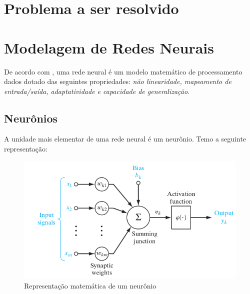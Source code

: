 \section{Problema a ser resolvido}

\section{Modelagem de Redes Neurais}
De acordo com \cite{haykin}, uma rede neural é um modelo matemático de processamento dados  dotado das seguintes propriedades: \textit{não linearidade, mapeamento de entrada/saída, adaptatividade e capacidade de generalização}. 



\subsection{Neurônios}
A unidade mais elementar de uma rede neural é um neurônio. Temo a seguinte representação: 
\begin{figure}[h!]
	\centering
	\includegraphics[width=0.5\linewidth]{imagens/neuronio}
	\caption{Representação matemática de um neurônio}
	\label{fig:neuronio}
\end{figure}

